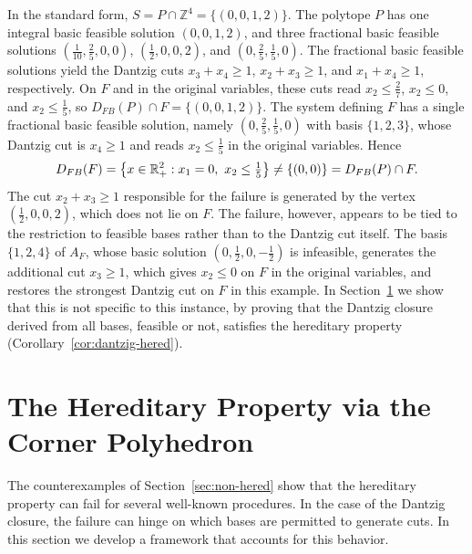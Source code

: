 \documentclass{article}
\newcommand{\Z}{\mathbb{Z}}
\newcommand{\R}{\mathbb{R}}
\begin{document}
In the standard form, $S = P \cap \Z^4 = \{(0,0,1,2)\}$. The polytope $P$ has one integral basic feasible solution $(0,0,1,2)$, and three fractional basic feasible solutions $(\frac{1}{10}, \frac{2}{5}, 0, 0)$, $(\frac{1}{2}, 0, 0, 2)$, and $(0, \frac{2}{5}, \frac{1}{5}, 0)$. The fractional basic feasible solutions yield the Dantzig cuts $x_3 + x_4 \geq 1$, $x_2 + x_3 \geq 1$, and $x_1 + x_4 \geq 1$, respectively. On $F$ and in the original variables, these cuts read $x_2 \leq \frac{2}{7}$, $x_2 \leq 0$, and $x_2 \leq \frac{1}{5}$, so $D_{FB}(P) \cap F = \{(0,0,1,2)\}$. The system defining $F$ has a single fractional basic feasible solution, namely $(0, \frac{2}{5}, \frac{1}{5}, 0)$ with basis $\{1,2,3\}$, whose Dantzig cut is $x_4 \geq 1$ and reads $x_2 \leq \frac{1}{5}$ in the original variables. Hence
\begin{align}
    D_{FB}(F) = \bigl\{x\in \R^2_+: x_1 = 0, \ x_2 \leq \tfrac{1}{5}\bigr\} \neq \{(0,0)\} = D_{FB}(P) \cap F. \notag
\end{align}
The cut $x_2 + x_3 \geq 1$ responsible for the failure is generated by the vertex $(\tfrac{1}{2}, 0, 0, 2)$, which does not lie on $F$. The failure, however, appears to be tied to the restriction to feasible bases rather than to the Dantzig cut itself. The basis $\{1,2,4\}$ of $A_F$, whose basic solution $(0, \tfrac{1}{2}, 0, -\tfrac{1}{2})$ is infeasible, generates the additional cut $x_3 \geq 1$, which gives $x_2 \leq 0$ on $F$ in the original variables, and restores the strongest Dantzig cut on $F$ in this example. In Section~\ref{sec:corner-polyhedron} we show that this is not specific to this instance, by proving that the Dantzig closure derived from all bases, feasible or not, satisfies the hereditary property (Corollary~\ref{cor:dantzig-hered}).

\section{The Hereditary Property via the Corner Polyhedron} \label{sec:corner-polyhedron}

The counterexamples of Section~\ref{sec:non-hered} show that the hereditary property can fail for several well-known procedures. In the case of the Dantzig closure, the failure can hinge on which bases are permitted to generate cuts. In this section we develop a framework that accounts for this behavior.
\end{document}
